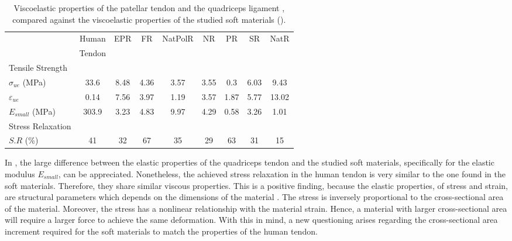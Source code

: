 \begin{table}[htbp!]
    \centering
    \caption[Viscoelastic properties of the patellar tendon and the quadriceps ligament, compared against the viscoelastic properties of the studied soft materials ().]{Viscoelastic properties of the patellar tendon and the quadriceps ligament \cite{johnson1994tensile,staubli1999mechanical,schatzmann1998effect}, compared against the viscoelastic properties of the studied soft materials ().}
    \begin{tabular}{lcccccccc}
    \toprule
    & Human & EPR & FR & NatPolR & NR & PR & SR & NatR \\
    & Tendon \\
    \hline
	Tensile Strength \\
    \hline
    $\sigma_{ue}$ (MPa)     & 33.6   & 8.48 & 4.36  & 3.57  & 3.55  & 0.3   & 6.03  & 9.43  \\
    $\varepsilon_{ue}$      & 0.14   & 7.56 & 3.97  & 1.19  & 3.57  & 1.87  & 5.77  & 13.02  \\
    $E_{small}$ (MPa)   & 303.9  & 3.23 & 4.83  & 9.97  & 4.29  & 0.58  & 3.26  & 1.01  \\
    \midrule
	Stress Relaxation \\
    \hline
    $S.R$ (\%)                          & 41     & 32    & 67   & 35    & 29    & 63    & 31    & 15\\
    \bottomrule
    \end{tabular}
    \label{tbl:tendon&soft}
\end{table}

In , the large difference between the elastic properties of the quadriceps tendon and the studied soft materials, specifically for the elastic modulus $E_{small}$, can be appreciated. Nonetheless, the achieved stress relaxation in the human tendon is very similar to the one found in the soft materials. Therefore, they share similar viscous properties. This is a positive finding, because the elastic properties, of stress and strain, are structural parameters which depends on the dimensions of the material . The stress is inversely proportional to the cross-sectional area of the material. Moreover, the stress has a nonlinear relationship with the material strain. Hence, a material with larger cross-sectional area will require a larger force to achieve the same deformation. With this in mind, a new questioning arises regarding the cross-sectional area increment required for the soft materials to match the properties of the human tendon.


